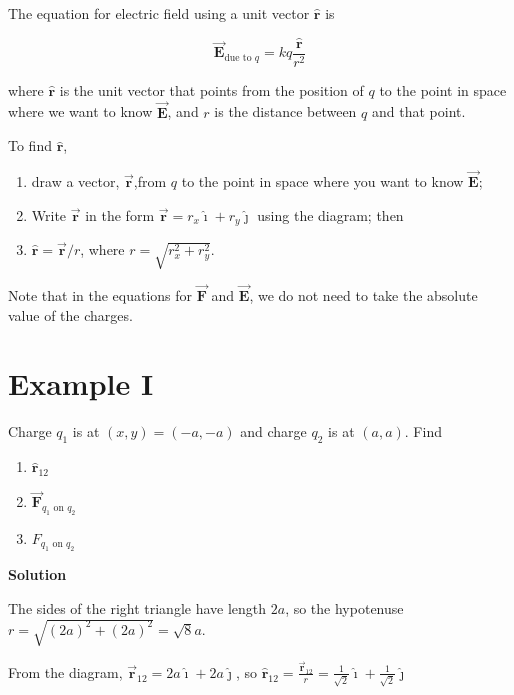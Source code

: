 \documentclass{article}
\newcommand{\ds}[0]{\displaystyle}
\newcommand{\ihat}[0]{\hat{\boldsymbol{\imath}}}
\newcommand{\jhat}[0]{\hat{\boldsymbol{\jmath}}}
\newcommand{\rhat}[0]{\hat{\mathbf{r}}}
\newcommand{\bfvec}[1]{\vec{\mathbf{#1}}}
\begin{document}
The equation for electric field using a unit vector $\rhat$ is

$$\bfvec{E}_{\text{due to }q}=kq\frac{\rhat}{r^2}$$

where $\rhat$ is the unit vector that points from the position of $q$ to the point in space where we want to know $\bfvec{E}$, and $r$ is the distance between $q$ and that point. 

To find $\rhat$, 

\begin{enumerate}

  \item draw a vector, $\bfvec{r}$,from $q$ to the point in space where you want to know $\bfvec{E}$;

  \item Write $\bfvec{r}$ in the form $\bfvec{r}=r_x\ihat+r_y\jhat$ using the diagram; then

  \item $\rhat=\bfvec{r}/r$, where $r=\sqrt{r_x^2+r_y^2}$.

\end{enumerate}

Note that in the equations for $\bfvec{F}$ and $\bfvec{E}$, we do not need to take the absolute value of the charges.

\newpage

\section{Example I}

Charge $q_1$ is at $(x,y)=(-a,-a)$ and charge $q_2$ is at $(a, a)$. Find

\begin{enumerate}

  \item $\rhat_{12}$

  \item $\bfvec{F}_{q_1\text{ on }q_2}$

  \item $F_{q_1\text{ on }q_2}$

\end{enumerate}

\textbf{Solution}



The sides of the right triangle have length $2a$, so the hypotenuse $r=\sqrt{(2a)^2+(2a)^2}=\sqrt{8}a$. 

From the diagram, $\bfvec{r}_{12}=2a\ihat + 2a\jhat$, so $\ds\rhat_{12}=\frac{\bfvec{r}_{12}}{r}=\frac{1}{\sqrt{2}}\ihat + \frac{1}{\sqrt{2}}\jhat$
\end{document}
